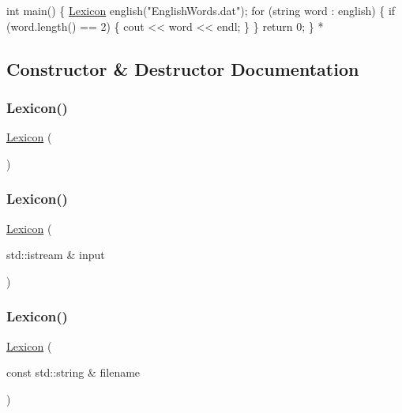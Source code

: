 \begin{DoxyPre}
     int main() \{
        \mbox{\hyperlink{classLexicon}{Lexicon}} english("EnglishWords.dat");
        for (string word : english) \{
           if (word.length() == 2) \{
              cout << word << endl;
           \}
        \}
        return 0;
     \}
*\end{DoxyPre}
 

\subsection{Constructor \& Destructor Documentation}
\mbox{\label{classLexicon_ac38cafae91a89528e71f257cbad724fd}} 
\subsubsection{\texorpdfstring{Lexicon()}{Lexicon()}\hspace{0.1cm}{\footnotesize\ttfamily [1/5]}}
{\footnotesize\ttfamily \mbox{\hyperlink{classLexicon}{Lexicon}} (\begin{DoxyParamCaption}{ }\end{DoxyParamCaption})}

\mbox{\label{classLexicon_a6e60e4bcfef0337c5133d3bedcccd06f}} 
\subsubsection{\texorpdfstring{Lexicon()}{Lexicon()}\hspace{0.1cm}{\footnotesize\ttfamily [2/5]}}
{\footnotesize\ttfamily \mbox{\hyperlink{classLexicon}{Lexicon}} (\begin{DoxyParamCaption}\item[{std\+::istream \&}]{input }\end{DoxyParamCaption})}

\mbox{\label{classLexicon_a64a064a38897e1e4ce9b755a238723f4}} 
\subsubsection{\texorpdfstring{Lexicon()}{Lexicon()}\hspace{0.1cm}{\footnotesize\ttfamily [3/5]}}
{\footnotesize\ttfamily \mbox{\hyperlink{classLexicon}{Lexicon}} (\begin{DoxyParamCaption}\item[{const std\+::string \&}]{filename }\end{DoxyParamCaption})}

